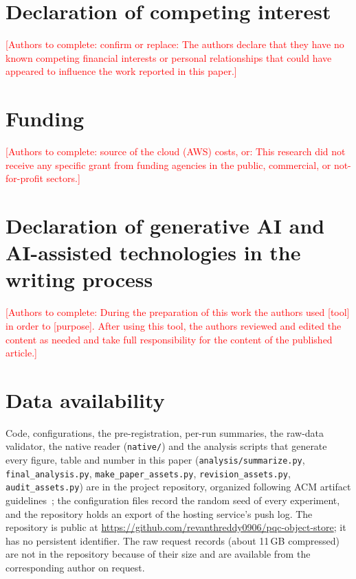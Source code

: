 \documentclass[review,12pt]{elsarticle}
\newcommand{\authorsgap}[1]{\textcolor{red}{[Authors to complete: #1]}}
\begin{document}
\section*{Declaration of competing interest}
\authorsgap{confirm or replace: The authors declare that they have no known competing financial
interests or personal relationships that could have appeared to influence the work reported in
this paper.}

\section*{Funding}
\authorsgap{source of the cloud (AWS) costs, or: This research did not receive any specific grant
from funding agencies in the public, commercial, or not-for-profit sectors.}

\section*{Declaration of generative AI and AI-assisted technologies in the writing process}
\authorsgap{During the preparation of this work the authors used [tool] in order to [purpose].
After using this tool, the authors reviewed and edited the content as needed and take full
responsibility for the content of the published article.}

\section*{Data availability}
Code, configurations, the pre-registration, per-run summaries, the raw-data validator, the
native reader (\texttt{native/}) and the analysis scripts that generate every figure, table and
number in this paper (\texttt{analysis/summarize.py}, \texttt{final\_analysis.py},
\texttt{make\_paper\_assets.py}, \texttt{revision\_assets.py}, \texttt{audit\_assets.py}) are in
the project repository, organized following ACM artifact guidelines~\cite{acmbadges}; the
configuration files record the random seed of every experiment, and the repository holds an
export of the hosting service's push log. The repository is public at
\url{https://github.com/revanthreddy0906/pqc-object-store}; it has no persistent identifier. The raw
request records (about 11\,GB compressed) are not in the repository because of their size and are
available from the corresponding author on request.



\end{document}
